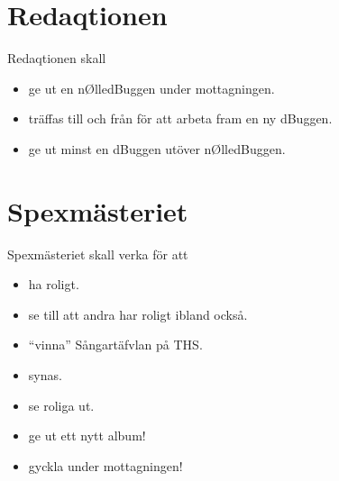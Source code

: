\documentclass{dgovdoc}
\begin{document}
\section{Redaqtionen}

Redaqtionen skall

\begin{itemize}
\item ge ut en nØlledBuggen under mottagningen.
\item träffas till och från för att arbeta fram en ny dBuggen.
\item ge ut minst en dBuggen utöver nØlledBuggen.
\end{itemize}

\section{Spexmästeriet}

Spexmästeriet skall verka för att

\begin{itemize}
\item ha roligt.
\item se till att andra har roligt ibland också.
\item ``vinna'' Sångartäfvlan på THS.
\item synas.
\item se roliga ut.
\item ge ut ett nytt album!
\item gyckla under mottagningen!
\end{itemize}
\end{document}
